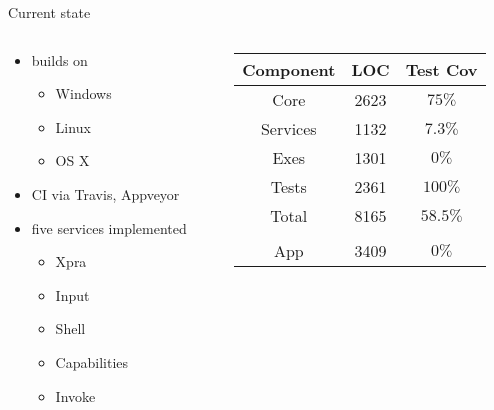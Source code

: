 \documentclass[a4paper]{beamer}
\begin{document}
\begin{frame}{Current state}
    \begin{columns}
        \begin{column}{0.40\textwidth}
            \begin{itemize}
                \item builds on
                    \begin{itemize}
                        \item Windows
                        \item Linux
                        \item OS X
                    \end{itemize}
                \item CI via Travis, Appveyor
                \item five services implemented
                    \begin{itemize}
                        \item Xpra
                        \item Input
                        \item Shell
                        \item Capabilities
                        \item Invoke
                    \end{itemize}
            \end{itemize}
        \end{column}
        \begin{column}{0.48\textwidth}
            \begin{table}
                \centering
                \begin{tabular}{c|c|c}
                    Component & LOC  & Test Cov\\
                    \hline
                    Core      & 2623 & $75\%$\\
                    Services  & 1132 & $7.3\%$\\
                    Exes      & 1301 & $0\%$\\
                    Tests     & 2361 & $100\%$\\
                    \hline
                    Total     & 8165 & $58.5\%$\\
                    &&\\
                    App       & 3409 & $0\%$
                \end{tabular}
            \end{table}
        \end{column}
    \end{columns}
\end{frame}
\end{document}
